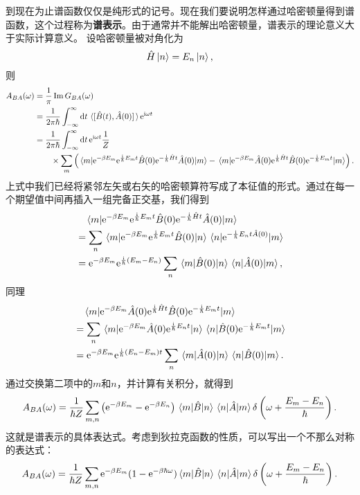 \documentclass[hyperref, UTF8, a4paper]{ctexart}
\newcommand*{\ii}{\mathrm{i}}
\newcommand*{\ee}{\mathrm{e}}
\begin{document}
到现在为止谱函数仅仅是纯形式的记号。现在我们要说明怎样通过哈密顿量得到谱函数，这个过程称为\textbf{谱表示}。由于通常并不能解出哈密顿量，谱表示的理论意义大于实际计算意义。
设哈密顿量被对角化为
\[
    \hat{H} \ket{n} = E_n \ket{n},
\]
则
\[
    \begin{aligned}
        A_{BA} (\omega) &= \frac{1}{\pi} \Im G_{BA}(\omega) \\
        &= \frac{1}{2 \pi \hbar} \int_{-\infty}^\infty \dd{t} \expval*{\comm*{\hat{B}(t)}{\hat{A}(0)}} \ee^{\ii \omega t} \\
        &= \frac{1}{2 \pi \hbar} \int_{-\infty}^\infty \dd{t} \ee^{\ii \omega t} \frac{1}{Z} \\
        & \quad \quad \times \sum_m \left( \mel{m}{\ee^{-\beta E_m} \ee^{\frac{\ii}{\hbar} E_m t} \hat{B}(0) \ee^{- \frac{\ii}{\hbar} \hat{H} t} \hat{A}(0) }{m} - \mel{m}{\ee^{-\beta E_m} \hat{A}(0) \ee^{\frac{\ii}{\hbar} \hat{H} t} \hat{B}(0) \ee^{- \frac{\ii}{\hbar} E_m t} }{m} \right).
    \end{aligned}
\]
上式中我们已经将紧邻左矢或右矢的哈密顿算符写成了本征值的形式。通过在每一个期望值中间再插入一组完备正交基，我们得到
\[
    \begin{aligned}
        &\quad \mel{m}{\ee^{-\beta E_m} \ee^{\frac{\ii}{\hbar} E_m t} \hat{B}(0) \ee^{- \frac{\ii}{\hbar} \hat{H} t} \hat{A}(0) }{m} \\
        &= \sum_n \mel{m}{\ee^{-\beta E_m} \ee^{\frac{\ii}{\hbar} E_m t} \hat{B}(0)}{n} \mel{n}{\ee^{- \frac{\ii}{\hbar} E_n t \hat{A}(0) }}{m} \\
        &= \ee^{- \beta E_m} \ee^{\frac{\ii}{\hbar} (E_m - E_n)} \sum_n \mel{m}{\hat{B}(0)}{n} \mel{n}{\hat{A}(0)}{m},
    \end{aligned}
\]
同理
\[
    \begin{aligned}
        &\quad \mel{m}{\ee^{-\beta E_m} \hat{A}(0) \ee^{\frac{\ii}{\hbar} \hat{H} t} \hat{B}(0) \ee^{- \frac{\ii}{\hbar} E_m t} }{m} \\
        &= \sum_n \mel{m}{\ee^{-\beta E_m} \hat{A}(0) \ee^{\frac{\ii}{\hbar} E_n t}}{n} \mel{n}{\hat{B}(0) \ee^{- \frac{\ii}{\hbar} E_m t}}{m} \\
        &= \ee^{-\beta E_m} \ee^{\frac{\ii}{\hbar} (E_n - E_m) t} \sum_n \mel{m}{\hat{A}(0)}{n} \mel{n}{\hat{B}(0)}{m}.
    \end{aligned}
\]
通过交换第二项中的$m$和$n$，并计算有关积分，就得到
\begin{equation}
    A_{BA}(\omega) = \frac{1}{\hbar Z} \sum_{m,n} \left( \ee^{-\beta E_m} - \ee^{-\beta E_n} \right) \mel{m}{\hat{B}}{n} \mel{n}{\hat{A}}{m} \delta\left( \omega + \frac{E_m - E_n}{\hbar} \right).
\end{equation}
这就是谱表示的具体表达式。考虑到狄拉克函数的性质，可以写出一个不那么对称的表达式：
\begin{equation}
    A_{BA}(\omega) = \frac{1}{\hbar Z} \sum_{m,n} \ee^{-\beta E_m} (1 - \ee^{- \beta \hbar \omega}) \mel{m}{\hat{B}}{n} \mel{n}{\hat{A}}{m} \delta\left( \omega + \frac{E_m - E_n}{\hbar} \right). 
\end{equation}
\end{document}
